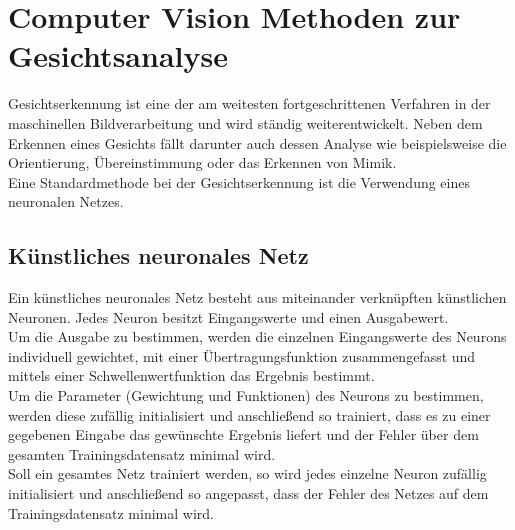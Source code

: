 \section{Computer Vision Methoden zur Gesichtsanalyse}
\label{Grundlagen}
Gesichtserkennung ist eine der am weitesten fortgeschrittenen Verfahren in der maschinellen Bildverarbeitung und wird ständig weiterentwickelt. Neben dem Erkennen eines Gesichts fällt darunter auch dessen Analyse wie beispielsweise die Orientierung, Übereinstimmung oder das Erkennen von Mimik.\\
Eine Standardmethode bei der Gesichtserkennung ist die Verwendung eines neuronalen Netzes.
\subsection{Künstliches neuronales Netz}
Ein künstliches neuronales Netz besteht aus miteinander verknüpften künstlichen Neuronen. Jedes Neuron besitzt Eingangswerte und einen Ausgabewert.\\
Um die Ausgabe zu bestimmen, werden die einzelnen Eingangswerte des Neurons individuell gewichtet, mit einer Übertragungsfunktion zusammengefasst und mittels einer Schwellenwertfunktion das Ergebnis bestimmt.\\
Um die Parameter (Gewichtung und Funktionen) des Neurons zu bestimmen, werden diese zufällig initialisiert und anschließend so trainiert, dass es zu einer gegebenen Eingabe das gewünschte Ergebnis liefert und der Fehler über dem gesamten Trainingsdatensatz minimal wird.\\
Soll ein gesamtes Netz trainiert werden, so wird jedes einzelne Neuron zufällig initialisiert und anschließend so angepasst, dass der Fehler des Netzes auf dem Trainingsdatensatz minimal wird.
\cite{Maschin_Neuron}
